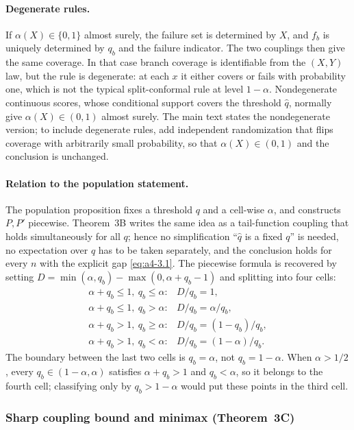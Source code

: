 \paragraph{Degenerate rules.}
If $\alpha(X)\in\{0,1\}$ almost surely, the failure set is determined by
$X$, and $f_b$ is uniquely determined by $q_b$ and the failure
indicator.  The two couplings then give the same coverage.  In that case
branch coverage is identifiable from the $(X,Y)$ law, but the rule is
degenerate: at each $x$ it either covers or fails with probability one,
which is not the typical split-conformal rule at level $1-\alpha$.
Nondegenerate continuous scores, whose conditional support covers the
threshold $\hat q$, normally give $\alpha(X)\in(0,1)$ almost surely.  The
main text states the nondegenerate version; to include degenerate rules,
add independent randomization that flips coverage with arbitrarily small
probability, so that $\alpha(X)\in(0,1)$ and the conclusion is unchanged.

\paragraph{Relation to the population statement.}
The population proposition fixes a threshold $q$ and a cell-wise
$\alpha$, and constructs $P,P'$ piecewise.  Theorem~3B writes the same
idea as a tail-function coupling that holds simultaneously for all $q$;
hence no simplification ``$\hat q$ is a fixed $q$'' is needed, no
expectation over $\hat q$ has to be taken separately, and the conclusion
holds for every $n$ with the explicit gap \eqref{eq:a4-3.1}.  The
piecewise formula is recovered by setting
$D=\min(\alpha,q_b)-\max(0,\alpha+q_b-1)$ and splitting into four cells:
\[
\begin{array}{ll}
\alpha+q_b\le1,\ q_b\le\alpha: & D/q_b=1,\\
\alpha+q_b\le1,\ q_b>\alpha: & D/q_b=\alpha/q_b,\\
\alpha+q_b>1,\ q_b\ge\alpha: & D/q_b=(1-q_b)/q_b,\\
\alpha+q_b>1,\ q_b<\alpha: & D/q_b=(1-\alpha)/q_b.
\end{array}
\]
The boundary between the last two cells is $q_b=\alpha$, not
$q_b=1-\alpha$.  When $\alpha>1/2$, every
$q_b\in(1-\alpha,\alpha)$ satisfies $\alpha+q_b>1$ and $q_b<\alpha$, so
it belongs to the fourth cell; classifying only by $q_b>1-\alpha$ would
put these points in the third cell.

\subsubsection{Sharp coupling bound and minimax (Theorem~3C)}

